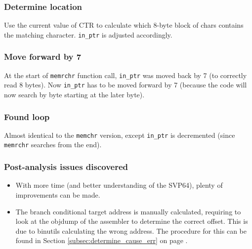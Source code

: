 \subsubsection{Determine location}

Use the current value of \acrshort{CTR} to calculate which 8-byte block of chars contains
the matching character. \texttt{in\_ptr} is adjusted accordingly.

\subsubsection{Move forward by 7}

At the start of \texttt{memrchr} function call, \texttt{in\_ptr} was
moved back by 7 (to correctly read 8 bytes). Now \texttt{in\_ptr} has to be
moved forward by 7 (because the code will now search by byte starting at the
later byte).

\subsubsection{Found loop}

Almost identical to the \texttt{memchr} version, except \texttt{in\_ptr} is
decremented (since \texttt{memrchr} searches from the end).

\subsubsection{Post-analysis issues discovered}

\begin{itemize}
  \item With more time (and better understanding of the \acrshort{SVP64}), plenty of
  improvements can be made.
  \item The branch conditional target address is manually calculated, requiring
  to look at the objdump of the assembler to determine the correct offset.
  This is due to binutils calculating the wrong address. The procedure for this
  can be found in Section \ref{subsec:determine_cause_err}
  on page \pageref{subsec:determine_cause_err}.
\end{itemize}

